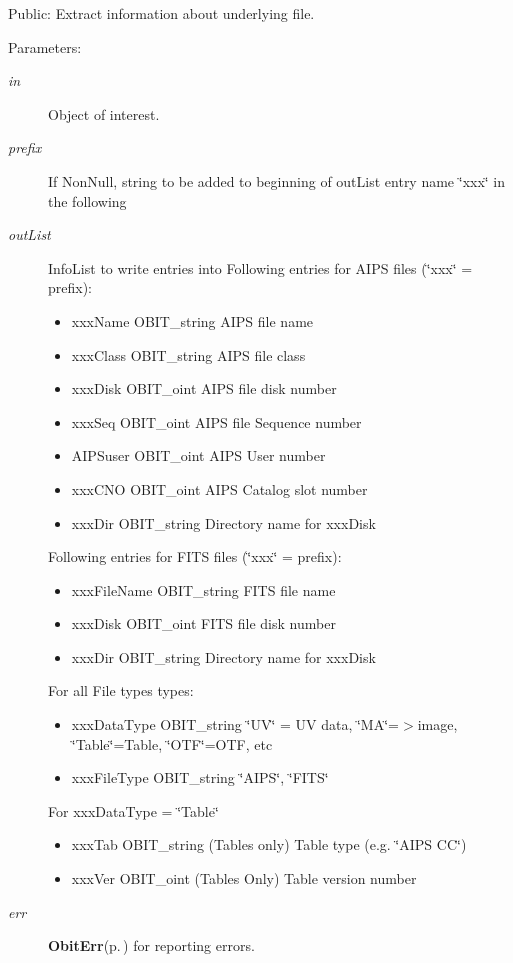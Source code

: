 Public: Extract information about underlying file. 

\begin{Desc}
\item[Parameters:]
\begin{description}
\item[{\em in}]Object of interest. \item[{\em prefix}]If Non\-Null, string to be added to beginning of out\-List entry name \char`\"{}xxx\char`\"{} in the following \item[{\em out\-List}]Info\-List to write entries into Following entries for AIPS files (\char`\"{}xxx\char`\"{} = prefix): \begin{itemize}
\item xxx\-Name OBIT\_\-string AIPS file name \item xxx\-Class OBIT\_\-string AIPS file class \item xxx\-Disk OBIT\_\-oint AIPS file disk number \item xxx\-Seq OBIT\_\-oint AIPS file Sequence number \item AIPSuser OBIT\_\-oint AIPS User number \item xxx\-CNO OBIT\_\-oint AIPS Catalog slot number \item xxx\-Dir OBIT\_\-string Directory name for xxx\-Disk\end{itemize}
Following entries for FITS files (\char`\"{}xxx\char`\"{} = prefix): \begin{itemize}
\item xxx\-File\-Name OBIT\_\-string FITS file name \item xxx\-Disk OBIT\_\-oint FITS file disk number \item xxx\-Dir OBIT\_\-string Directory name for xxx\-Disk\end{itemize}
For all File types types: \begin{itemize}
\item xxx\-Data\-Type OBIT\_\-string \char`\"{}UV\char`\"{} = UV data, \char`\"{}MA\char`\"{}=$>$image, \char`\"{}Table\char`\"{}=Table, \char`\"{}OTF\char`\"{}=OTF, etc \item xxx\-File\-Type OBIT\_\-string \char`\"{}AIPS\char`\"{}, \char`\"{}FITS\char`\"{}\end{itemize}
For xxx\-Data\-Type = \char`\"{}Table\char`\"{} \begin{itemize}
\item xxx\-Tab OBIT\_\-string (Tables only) Table type (e.g. \char`\"{}AIPS CC\char`\"{}) \item xxx\-Ver OBIT\_\-oint (Tables Only) Table version number\end{itemize}
\item[{\em err}]{\bf Obit\-Err}{\rm (p.\,\pageref{structObitErr})} for reporting errors. \end{description}
\end{Desc}
